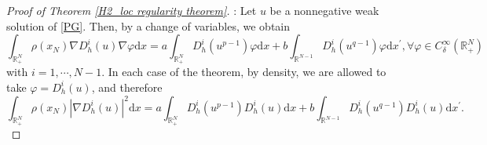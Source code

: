 \documentclass[12pt,reqno]{amsart}
\begin{document}
\begin{proof}[Proof of Theorem \ref{H2_loc regularity theorem}]: Let $u$ be a nonnegative weak solution of \eqref{PG}. Then, by a change of variables, we obtain
\begin{equation*}
      \int_{\mathds{R}^N_+}\rho(x_N)\nabla D_h^i(u)\nabla \varphi\mathrm{d}x=a\int_{\mathds{R}^N_+}D_h^i(u^{p-1})\varphi\mathrm{d}x+b\int_{\mathds{R}^{N-1}}D_h^i(u^{q-1})\varphi\mathrm{d}x^\prime, \forall \varphi \in C^\infty_\delta(\mathds{R}^N_+)
\end{equation*}
with $i=1,\cdots, N-1$. In each case of the theorem, by density, we are allowed to take $\varphi=D^i_h (u)$, and therefore
\begin{equation}\label{Dhi test}
    \int_{\mathds{R}^N_+}\rho(x_N)|\nabla D_h^i(u)|^2\mathrm{d}x=a\int_{\mathds{R}^N_+}D_h^i(u^{p-1})D_h^i(u)\mathrm{d}x+b\int_{\mathds{R}^{N-1}}D_h^i(u^{q-1})D_h^i(u)\mathrm{d}x^\prime.
\end{equation}


\end{proof}
\end{document}
